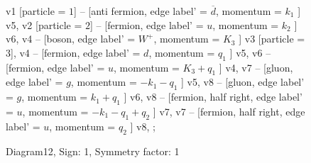 \documentclass{revtex4}
\begin{document}
\begin{figure}[!htb]
\begin{center}
{    %
v1 [particle = \(1\)] -- [anti fermion, edge label' = \(\overline{d}\), momentum = \(k_{1}\) ] v5, 
v2 [particle = \(2\)] -- [fermion, edge label' = \(u\), momentum = \(k_{2}\) ] v6, 
v4 -- [boson, edge label' = \(W^{+}\), momentum = \(K_{3}\) ] v3 [particle = \(3\)], 
v4 -- [fermion, edge label' = \(d\), momentum = \(q_{1}\) ] v5, 
v6 -- [fermion, edge label' = \(u\), momentum = \(K_{3} + q_{1}\) ] v4, 
v7 -- [gluon, edge label' = \(g\), momentum = \(-k_{1} - q_{1}\) ] v5, 
v8 -- [gluon, edge label' = \(g\), momentum = \(k_{1} + q_{1}\) ] v6, 
v8 -- [fermion, half right, edge label' = \(u\), momentum = \(-k_{1} - q_{1} + q_{2}\) ] v7, 
v7 -- [fermion, half right, edge label' = \(u\), momentum = \(q_{2}\) ] v8, 
};
\end{center}
\caption{Diagram12, Sign: 1, Symmetry factor: 1}
\end{figure}
\newpage
\end{document}
